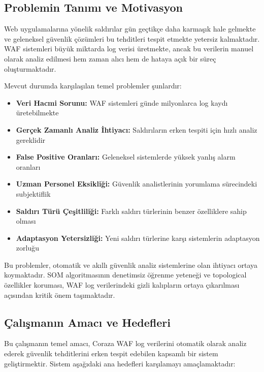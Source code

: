 \subsection{Problemin Tanımı ve Motivasyon}

Web uygulamalarına yönelik saldırılar gün geçtikçe daha karmaşık hale gelmekte ve geleneksel güvenlik çözümleri bu tehditleri tespit etmekte yetersiz kalmaktadır. WAF sistemleri büyük miktarda log verisi üretmekte, ancak bu verilerin manuel olarak analiz edilmesi hem zaman alıcı hem de hataya açık bir süreç oluşturmaktadır.

Mevcut durumda karşılaşılan temel problemler şunlardır:

\begin{itemize}
    \item \textbf{Veri Hacmi Sorunu:} WAF sistemleri günde milyonlarca log kaydı üretebilmekte
    \item \textbf{Gerçek Zamanlı Analiz İhtiyacı:} Saldırıların erken tespiti için hızlı analiz gereklidir
    \item \textbf{False Positive Oranları:} Geleneksel sistemlerde yüksek yanlış alarm oranları
    \item \textbf{Uzman Personel Eksikliği:} Güvenlik analistlerinin yorumlama sürecindeki subjektiflik
    \item \textbf{Saldırı Türü Çeşitliliği:} Farklı saldırı türlerinin benzer özelliklere sahip olması
    \item \textbf{Adaptasyon Yetersizliği:} Yeni saldırı türlerine karşı sistemlerin adaptasyon zorluğu
\end{itemize}

Bu problemler, otomatik ve akıllı güvenlik analiz sistemlerine olan ihtiyacı ortaya koymaktadır. SOM algoritmasının denetimsiz öğrenme yeteneği ve topological özellikler koruması, WAF log verilerindeki gizli kalıpların ortaya çıkarılması açısından kritik önem taşımaktadır.

\subsection{Çalışmanın Amacı ve Hedefleri}

Bu çalışmanın temel amacı, Coraza WAF log verilerini otomatik olarak analiz ederek güvenlik tehditlerini erken tespit edebilen kapsamlı bir sistem geliştirmektir. Sistem aşağıdaki ana hedefleri karşılamayı amaçlamaktadır:

